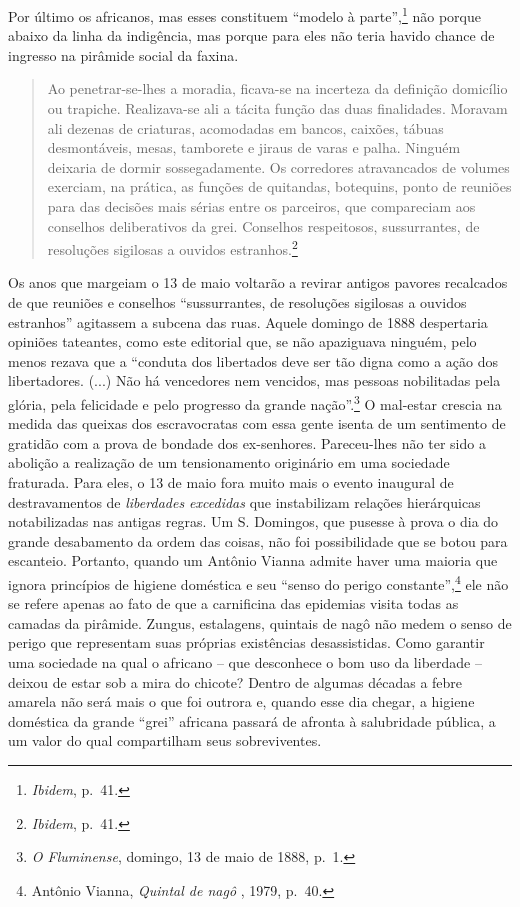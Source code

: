 Por último os africanos, mas esses constituem ``modelo à
parte'',\footnote{\emph{Ibidem}, p.~41.} não porque abaixo da linha da
indigência, mas porque para eles não teria havido chance de ingresso na
pirâmide social da faxina.

\begin{quote}
Ao penetrar-se-lhes a moradia, ficava-se na incerteza da definição
domicílio ou trapiche. Realizava-se ali a tácita função das duas
finalidades. Moravam ali dezenas de criaturas, acomodadas em bancos,
caixões, tábuas desmontáveis, mesas, tamborete e jiraus de varas e
palha. Ninguém deixaria de dormir sossegadamente. Os corredores
atravancados de volumes exerciam, na prática, as funções de quitandas,
botequins, ponto de reuniões para das decisões mais sérias entre os
parceiros, que compareciam aos conselhos deliberativos da grei.
Conselhos respeitosos, sussurrantes, de resoluções sigilosas a ouvidos
estranhos.\footnote{\emph{Ibidem}, p.~41.}
\end{quote}

Os anos que margeiam o 13 de maio voltarão a revirar antigos pavores
recalcados de que reuniões e conselhos ``sussurrantes, de resoluções
sigilosas a ouvidos estranhos'' agitassem a subcena das ruas. Aquele
domingo de 1888 despertaria opiniões tateantes, como este editorial que,
se não apaziguava ninguém, pelo menos rezava que a ``conduta dos
libertados deve ser tão digna como a ação dos libertadores. (...) Não há
vencedores nem vencidos, mas pessoas nobilitadas pela glória, pela
felicidade e pelo progresso da grande nação''.\footnote{\emph{O
  Fluminense}, domingo, 13 de maio de 1888, p.~1.} O mal-estar crescia
na medida das queixas dos escravocratas com essa gente isenta de um
sentimento de gratidão com a prova de bondade dos ex-senhores.
Pareceu-lhes não ter sido a abolição a realização de um tensionamento
originário em uma sociedade fraturada. Para eles, o 13 de maio fora
muito mais o evento inaugural de destravamentos de \emph{liberdades
excedidas} que instabilizam relações hierárquicas notabilizadas nas
antigas regras. Um S. Domingos, que pusesse à prova o dia do grande
desabamento da ordem das coisas, não foi possibilidade que se botou para
escanteio. Portanto, quando um Antônio Vianna admite haver uma maioria
que ignora princípios de higiene doméstica e seu ``senso do perigo
constante'',\footnote{Antônio Vianna, \emph{Quintal de nagô} , 1979,
  p.~40.} ele não se refere apenas ao fato de que a carnificina das
epidemias visita todas as camadas da pirâmide. Zungus, estalagens,
quintais de nagô não medem o senso de perigo que representam suas
próprias existências desassistidas. Como garantir uma sociedade na qual
o africano -- que desconhece o bom uso da liberdade -- deixou de estar
sob a mira do chicote? Dentro de algumas décadas a febre amarela não
será mais o que foi outrora e, quando esse dia chegar, a higiene
doméstica da grande ``grei'' africana passará de afronta à salubridade
pública, a um valor do qual compartilham seus sobreviventes.

